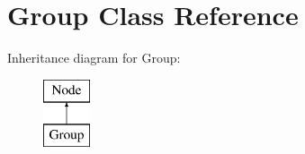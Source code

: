 \hypertarget{class_open_chams_1_1_group}{\section{Group Class Reference}
\label{class_open_chams_1_1_group}
}
Inheritance diagram for Group\-:\begin{figure}[H]
\begin{center}
\leavevmode
\includegraphics[height=2.000000cm]{class_open_chams_1_1_group}
\end{center}
\end{figure}
